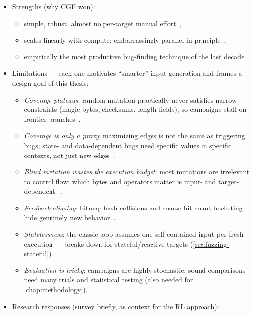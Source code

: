 \begin{itemize}
  \item Strengths (why CGF won):
    \begin{itemize}
      \item simple, robust, almost no per-target manual effort~\cite{manes_art_2019},
      \item scales linearly with compute; embarrassingly parallel in
        principle~\cite{zhou_kraken_2025},
      \item empirically the most productive bug-finding technique of the last
        decade~\cite{manes_art_2019,fioraldi_afl_nodate}.
    \end{itemize}
  \item Limitations --- each one motivates ``smarter'' input generation and frames a design goal of
    this thesis:
    \begin{itemize}
      \item \emph{Coverage plateaus}: random mutation practically never satisfies narrow
        constraints (magic bytes, checksums, length fields), so campaigns stall on frontier
        branches~\cite{stephens_driller_2016,she_neuzz_2019}.
      \item \emph{Coverage is only a proxy}: maximizing edges is not the same as triggering bugs;
        state- and data-dependent bugs need specific values in specific contexts, not just new
        edges~\cite{chen_critical_nodate}.
      \item \emph{Blind mutation wastes the execution budget}: most mutations are irrelevant to
        control flow; which bytes and operators matter is input- and target-dependent
        ~\cite{lyu_mopt_nodate,binosi_rainfuzz_2023}.
      \item \emph{Feedback aliasing}: bitmap hash collisions and coarse hit-count bucketing hide
        genuinely new behavior~\cite{gan_collafl_2018}.
      \item \emph{Statelessness}: the classic loop assumes one self-contained input per fresh
        execution --- breaks down for stateful/reactive targets (\cref{sec:fuzzing-stateful}).
      \item \emph{Evaluation is tricky}: campaigns are highly stochastic; sound comparisons need
        many trials and statistical testing  (also needed for \cref{chap:methodology}).
    \end{itemize}
  \item Research responses (survey briefly, as context for the RL approach):

\end{itemize}

